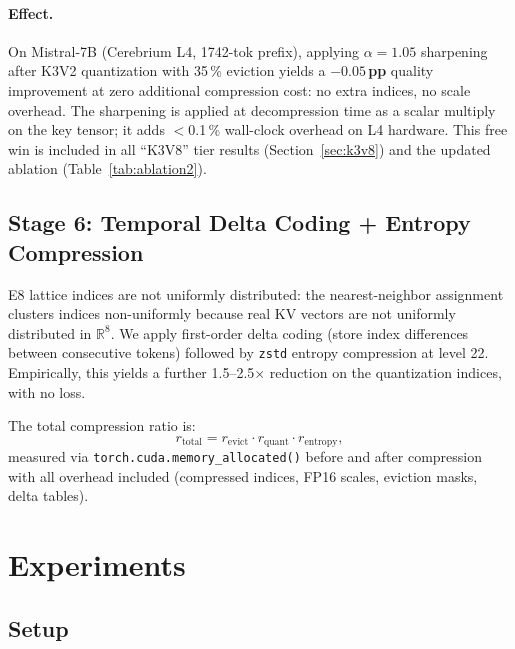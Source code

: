 \documentclass{article}
\begin{document}
\paragraph{Effect.}
On Mistral-7B (Cerebrium L4, 1742-tok prefix), applying $\alpha{=}1.05$ sharpening
after K3V2 quantization with 35\,\% eviction yields a $\mathbf{-0.05}$\,\textbf{pp}
quality improvement at zero additional compression cost: no extra indices, no
scale overhead.  The sharpening is applied at decompression time as a scalar
multiply on the key tensor; it adds $<$0.1\,\% wall-clock overhead on L4 hardware.
This free win is included in all ``K3V8'' tier results (Section~\ref{sec:k3v8})
and the updated ablation (Table~\ref{tab:ablation2}).

\subsection{Stage 6: Temporal Delta Coding + Entropy Compression}
\label{sec:entropy}

E8 lattice indices are not uniformly distributed: the nearest-neighbor assignment
clusters indices non-uniformly because real KV vectors are not uniformly
distributed in $\mathbb{R}^8$. We apply first-order delta coding
(store index differences between consecutive tokens) followed by
\texttt{zstd} entropy compression at level 22. Empirically, this yields a
further 1.5--2.5$\times$ reduction on the quantization indices, with no loss.

The total compression ratio is:
\begin{equation}
  r_\text{total} = r_\text{evict} \cdot r_\text{quant} \cdot r_\text{entropy},
  \label{eq:ratio}
\end{equation}
measured via \texttt{torch.cuda.memory\_allocated()} before and after
compression with all overhead included (compressed indices, FP16 scales,
eviction masks, delta tables).

\section{Experiments}
\label{sec:experiments}

\subsection{Setup}
\label{sec:setup}
\end{document}

